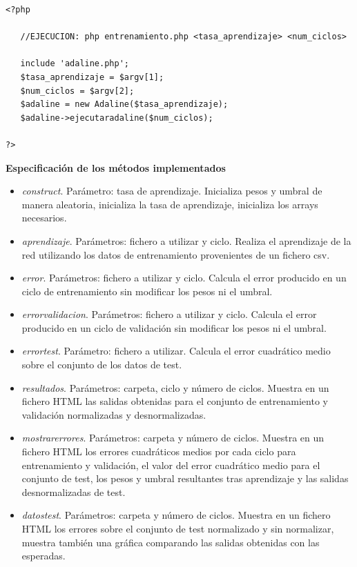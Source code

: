 \documentclass[11pt,spanish,listoffigures,listoftables]{workluis}
\begin{document}
\begin{lstlisting}
<?php

   //EJECUCION: php entrenamiento.php <tasa_aprendizaje> <num_ciclos>

   include 'adaline.php';
   $tasa_aprendizaje = $argv[1];
   $num_ciclos = $argv[2];
   $adaline = new Adaline($tasa_aprendizaje);
   $adaline->ejecutaradaline($num_ciclos);

?>
\end{lstlisting}

\par \textbf{Especificación de los métodos implementados}

\begin{itemize}
\item \textit{construct}. Parámetro: tasa de aprendizaje. Inicializa pesos y umbral de manera aleatoria, inicializa la tasa de aprendizaje, inicializa los arrays necesarios.
\item \textit{aprendizaje}. Parámetros: fichero a utilizar y ciclo. Realiza el aprendizaje de la red utilizando los datos de entrenamiento provenientes de un fichero csv.
\item \textit{error}. Parámetros: fichero a utilizar y ciclo. Calcula el error producido en un ciclo de entrenamiento sin modificar los pesos ni el umbral.
\item \textit{errorvalidacion}. Parámetros: fichero a utilizar y ciclo. Calcula el error producido en un ciclo de validación sin modificar los pesos ni el umbral.
\item \textit{errortest}. Parámetro: fichero a utilizar. Calcula el error cuadrático medio sobre el conjunto de los datos de test.
\item \textit{resultados}. Parámetros: carpeta, ciclo y número de ciclos. Muestra en un fichero HTML las salidas obtenidas para el conjunto de entrenamiento y validación normalizadas y desnormalizadas.
\item \textit{mostrarerrores}. Parámetros: carpeta y número de ciclos. Muestra en un fichero HTML los errores cuadráticos medios por cada ciclo para entrenamiento y validación, el valor del error cuadrático medio para el conjunto de test, los pesos y umbral resultantes tras aprendizaje y las salidas desnormalizadas de test.
\item \textit{datostest}. Parámetros: carpeta y número de ciclos. Muestra en un fichero HTML los errores sobre el conjunto de test normalizado y sin normalizar, muestra también una gráfica comparando las salidas obtenidas con las esperadas.
\end{itemize}
\end{document}
